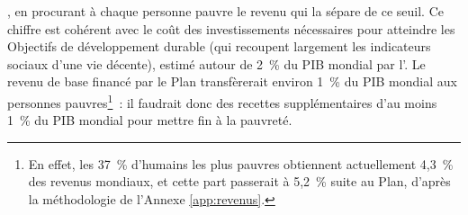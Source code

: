 \documentclass[a5paper,french,openany]{memoir}
\begin{document}
, en procurant à chaque personne pauvre le revenu qui la sépare de ce seuil. Ce chiffre est cohérent avec le coût des investissements nécessaires pour atteindre les Objectifs de développement durable (qui recoupent largement les indicateurs sociaux d'une vie décente), estimé autour de 2~\% du PIB mondial par l'\cite{unctad_estimating_2021}. %
Le revenu de base financé par le Plan transfèrerait environ 1~\% du PIB mondial aux personnes pauvres\footnote{En effet, les 37~\% d'humains les plus pauvres obtiennent actuellement 4,3~\% des revenus mondiaux, et cette part passerait à 5,2~\% suite au Plan, d'après la méthodologie de l'Annexe \ref{app:revenus}.}~: %
il faudrait donc des recettes supplémentaires d'au moins 1~\% du PIB mondial pour mettre fin à la pauvreté. %
\end{document}
